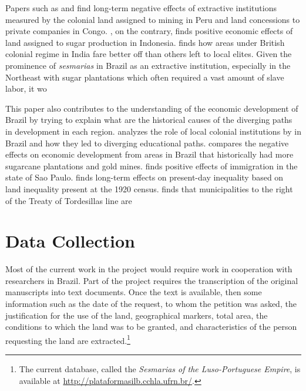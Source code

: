 \documentclass{article}
\begin{document}
Papers such as \textcite{Dell2010-qt} and \textcite{Lowes2020-pr} find long-term negative effects of extractive institutions measured by the colonial land assigned to mining in Peru and land concessions to private companies in Congo. 
\textcite{Dell2019-np}, on the contrary, finds positive economic effects of land assigned to sugar production in Indonesia. 
\textcite{Banerjee2005-ki} finds how areas under British colonial regime in India fare better off than others left to local elites.
Given the prominence of \textit{sesmarias} in Brazil as an extractive institution, especially in the Northeast with sugar plantations which often required a vast amount of slave labor, it wo

This paper also contributes to the understanding of the economic development of Brazil by trying to explain what are the historical causes of the diverging paths in development in each region. 
\textcite{Musacchio2014-pq} analyzes the role of local colonial institutions by in Brazil and how they led to diverging educational paths. 
\textcite{Naritomi2012-or} compares the negative effects on economic development from areas in Brazil that historically had more sugarcane plantations and gold mines. 
\textcite{Rocha2017-yq} finds positive effects of immigration in the state of Sao Paulo. 
\textcite{Wigton-Jones2020-ex} finds long-term effects on present-day inequality based on land inequality present at the 1920 census. 
\textcite{Laudares2022-vy} finds that municipalities to the right of the Treaty of Tordesillas line are 

\section{Data Collection}

Most of the current work in the project would require work in cooperation with researchers in Brazil. 
Part of the project requires the transcription of the original manuscripts into text documents.
Once the text is available, then some information such as the date of the request, to whom the petition was asked, the justification for the use of the land, geographical markers, total area, the conditions to which the land was to be granted, and characteristics of the person requesting the land are extracted.\footnote{The current database, called the \textit{Sesmarias of the Luso-Portuguese Empire}, is available at \url{http://plataformasilb.cchla.ufrn.br/}.} 
\end{document}
